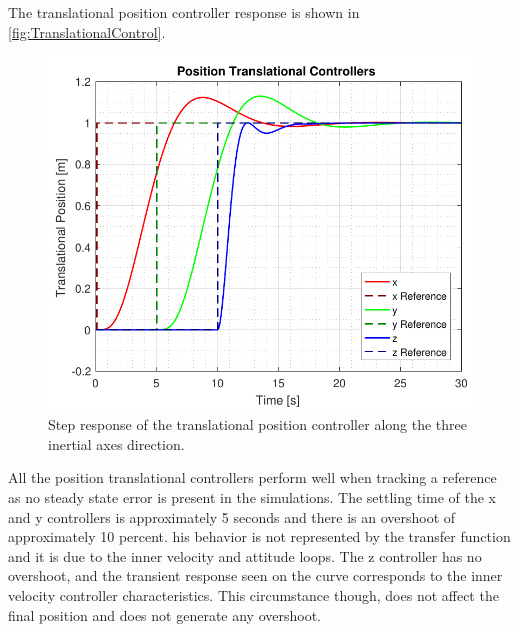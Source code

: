 The translational position controller response is shown in \autoref{fig:TranslationalControl}.
\begin{figure}[H]
	\centering
	\includegraphics[scale=0.65]{figures/simTranslationalControl}
	\caption{Step response of the translational position controller along the three inertial axes direction.}
	\label{fig:TranslationalControl}
\end{figure}
All the position translational controllers perform well when tracking a reference as no steady state error is present in the simulations. The settling time of the x and y controllers is approximately 5 seconds and there is an overshoot of approximately 10 percent. his behavior is not represented by the transfer function and it is due to the inner velocity and attitude loops. 
The z controller has no overshoot, and the transient response seen on the curve corresponds to the inner velocity controller characteristics. This circumstance though, does not affect the final position and does not generate any overshoot. 

